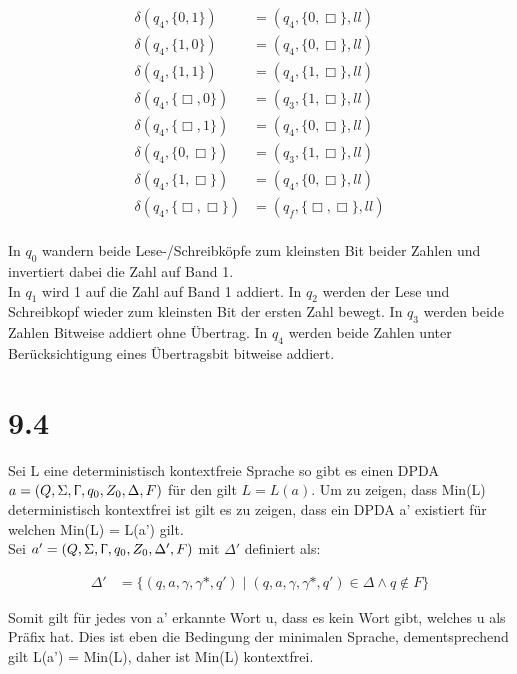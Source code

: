 \documentclass[12pt, a4paper]{article}
\begin{document}
\begin{align*}
\delta(q_4, \{0,1\}) &=(q_4, \{0,\Box\},ll)\\
\delta(q_4, \{1,0\}) &=(q_4, \{0,\Box\},ll)\\
\delta(q_4, \{1,1\}) &=(q_4, \{1,\Box\},ll)\\
\delta(q_4, \{\Box,0\}) &=(q_3, \{1,\Box\},ll)\\
\delta(q_4, \{\Box,1\}) &=(q_4, \{0,\Box\},ll)\\
\delta(q_4, \{0,\Box\}) &=(q_3, \{1,\Box\},ll)\\
\delta(q_4, \{1,\Box\}) &=(q_4, \{0,\Box\},ll)\\
\delta(q_4, \{\Box,\Box\}) &=(q_f, \{\Box,\Box\},ll)\\
\end{align*}

In $q_0$ wandern beide Lese-/Schreibköpfe zum kleinsten Bit beider Zahlen und invertiert dabei die Zahl auf Band 1.\\
In $q_1$ wird 1 auf die Zahl auf Band 1 addiert.
In $q_2$ werden der Lese und Schreibkopf wieder zum kleinsten Bit der ersten Zahl bewegt.
In $q_3$ werden beide Zahlen Bitweise addiert ohne Übertrag.
In $q_4$ werden beide Zahlen unter Berücksichtigung eines Übertragsbit bitweise addiert.


\section*{9.4}
Sei L eine deterministisch kontextfreie Sprache so gibt es einen DPDA $a = (Q, \Sigma, \Upgamma, q_0, Z_0, \Delta, F)$ für den gilt $L = L(a)$.
Um zu zeigen, dass Min(L) deterministisch kontextfrei ist gilt es zu zeigen, dass ein DPDA a' existiert für welchen Min(L) = L(a') gilt. \\

Sei $a' = (Q, \Sigma, \Upgamma, q_0, Z_0, \Delta', F)$ mit $\Delta'$ definiert als: 

\begin{align*}
\Delta' &= \{(q, a, \gamma, \gamma*, q') \mid  (q, a, \gamma, \gamma*, q') \in \Delta \wedge q \notin F \}
\end{align*}

Somit gilt für jedes von a' erkannte Wort u, dass es kein Wort gibt, welches u als Präfix hat. Dies ist eben die Bedingung der minimalen Sprache, dementsprechend gilt L(a') = Min(L), daher ist Min(L) kontextfrei.
\end{document}
